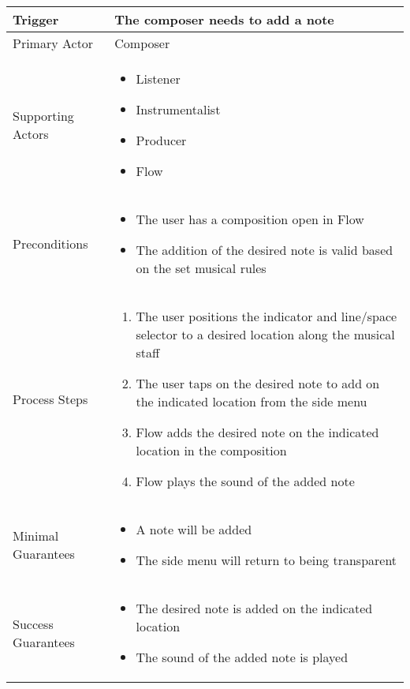 \begin{longtable}{|X|X|}
\hline
Trigger & The composer needs to add a note \\
\hline
Primary Actor & 
Composer \\
\hline
Supporting Actors & 
\begin{itemize}
\item Listener
\item Instrumentalist
\item Producer
\item Flow
\end{itemize} \\
\hline
Preconditions & 
\begin{itemize}
\item The user has a composition open in Flow 
\item The addition of the desired note is valid based on the set musical rules
\end{itemize} \\
\hline
Process Steps & 
\begin{enumerate}
\item The user positions the indicator and line/space selector to a desired location along the musical staff
\item The user taps on the desired note to add on the indicated location from the side menu
\item Flow adds the desired note on the indicated location in the composition
\item Flow plays the sound of the added note
\end{enumerate} \\
\hline
Minimal Guarantees & 
\begin{itemize}
  \item A note will be added
  \item The side menu will return to being transparent
\end{itemize} \\
\hline
Success Guarantees & 
\begin{itemize}
\item The desired note is added on the indicated location
\item The sound of the added note is played
\end{itemize} \\
\hline
\end{longtable}